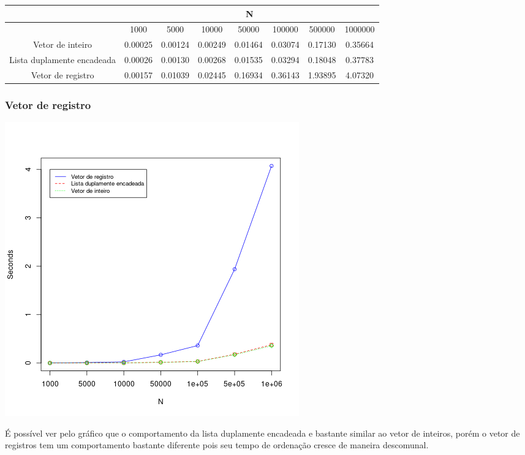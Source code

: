 \documentclass[11pt]{article}
\begin{document}
  \label{table:table_tm}
  \begin{tabular}{| c | c | c | c | c | c | c | c |}
  \hline
  & \multicolumn{7}{|c|}{N} \\\hline
  & 1000 & 5000 & 10000 & 50000 & 100000 & 500000 & 1000000 \\\hline
  Vetor de inteiro& 0.00025 & 0.00124 & 0.00249 & 0.01464 & 0.03074& 0.17130 & 0.35664 \\\hline
  Lista duplamente encadeada&0.00026 &0.00130 & 0.00268 & 0.01535 & 0.03294 & 0.18048 & 0.37783 \\ \hline
  Vetor de registro& 0.00157 & 0.01039 & 0.02445& 0.16934 & 0.36143 & 1.93895 & 4.07320 \\ \hline
  \end{tabular}

\subsubsection{Vetor de registro}
\label{sec:org9075efa}


\begin{center}
\includegraphics[width=.9\linewidth]{lists_t.png}
\end{center}

É possível ver pelo gráfico que o comportamento da lista duplamente encadeada e bastante similar ao vetor de inteiros, porém o vetor de registros tem um comportamento bastante diferente pois seu tempo de ordenação cresce de maneira descomunal.
\end{document}
